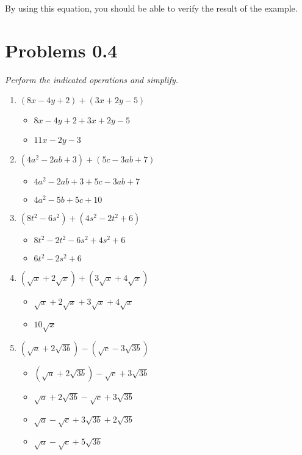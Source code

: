 \documentclass{article}
\begin{document}
\begin{onehalfspace}
By using this equation, you should be able to verify the result of the example.

\section{Problems 0.4}
\textit{Perform the indicated operations and simplify.}

\begin{enumerate}
    \item $(8x - 4y + 2) + (3x + 2y - 5)$
    \begin{itemize}
        \item $8x - 4y + 2 + 3x + 2y - 5$
        \item $11x - 2y - 3$
    \end{itemize}

    \item $(4a^{2} - 2ab + 3) + (5c - 3ab + 7)$
    \begin{itemize}
        \item $4a^{2} - 2ab + 3 + 5c - 3ab + 7$
        \item $4a^{2} - 5b + 5c + 10$
    \end{itemize}

    \item $(8t^{2} - 6s^{2}) + (4s^{2} - 2t^{2} + 6)$
    \begin{itemize}
        \item $8t^{2} - 2t^{2} - 6s^{2} + 4s^{2} + 6$
        \item $6t^{2} - 2s^{2} + 6$
    \end{itemize}

    \item $(\sqrt{x} + 2\sqrt{x}) + (3\sqrt{x} + 4\sqrt{x})$
    \begin{itemize}
        \item $\sqrt{x} + 2\sqrt{x} + 3\sqrt{x} + 4\sqrt{x}$
        \item $10\sqrt{x}$
    \end{itemize}

    \item $(\sqrt{a} + 2\sqrt{3b}) - (\sqrt{c} - 3\sqrt{3b})$
    \begin{itemize}
        \item $(\sqrt{a} + 2\sqrt{3b}) - \sqrt{c} + 3\sqrt{3b}$
        \item $\sqrt{a} + 2\sqrt{3b} - \sqrt{c} + 3\sqrt{3b}$
        \item $\sqrt{a} - \sqrt{c} + 3\sqrt{3b} + 2\sqrt{3b}$
        \item $\sqrt{a} - \sqrt{c} + 5\sqrt{3b}$
    \end{itemize}


\end{enumerate}
\end{onehalfspace}
\end{document}

